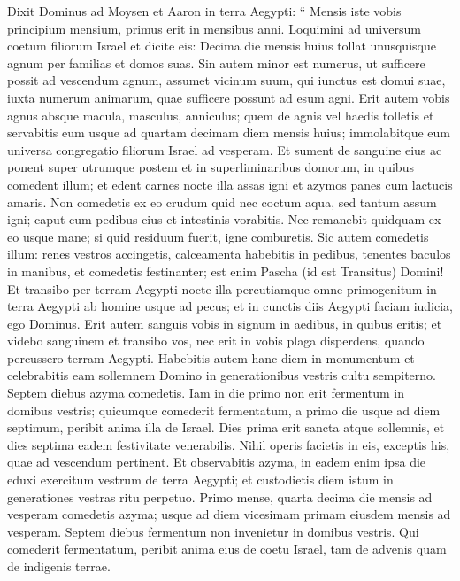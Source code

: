 \begin{biblechapter}
\begin{biblechapter}
\begin{biblechapter}
\begin{biblechapter}
\begin{biblechapter}
\begin{biblechapter}
\begin{biblechapter}
\begin{biblechapter}
\begin{biblechapter}
\begin{biblechapter}
\begin{biblechapter}
\begin{biblechapter}
\verse Dixit Dominus ad Moysen et Aaron in terra Aegypti: 
\verse “ Mensis iste vobis principium mensium, primus erit in mensibus anni. 
\verse Loquimini ad universum coetum filiorum Israel et dicite eis: Decima die mensis huius tollat unusquisque agnum per familias et domos suas. 
\verse Sin autem minor est numerus, ut sufficere possit ad vescendum agnum, assumet vicinum suum, qui iunctus est domui suae, iuxta numerum animarum, quae sufficere possunt ad esum agni. 
\verse Erit autem vobis agnus absque macula, masculus, anniculus; quem de agnis vel haedis tolletis 
\verse et servabitis eum usque ad quartam decimam diem mensis huius; immolabitque eum universa congregatio filiorum Israel ad vesperam. 
\verse Et sument de sanguine eius ac ponent super utrumque postem et in superliminaribus domorum, in quibus comedent illum; 
\verse et edent carnes nocte illa assas igni et azymos panes cum lactucis amaris. 
\verse Non comedetis ex eo crudum quid nec coctum aqua, sed tantum assum igni; caput cum pedibus eius et intestinis vorabitis. 
\verse Nec remanebit quidquam ex eo usque mane; si quid residuum fuerit, igne comburetis. 
\verse Sic autem comedetis illum: renes vestros accingetis, calceamenta habebitis in pedibus, tenentes baculos in manibus, et comedetis festinanter; est enim Pascha (id est Transitus) Domini!
 \verse Et transibo per terram Aegypti nocte illa percutiamque omne primogenitum in terra Aegypti ab homine usque ad pecus; et in cunctis diis Aegypti faciam iudicia, ego Dominus. 
\verse Erit autem sanguis vobis in signum in aedibus, in quibus eritis; et videbo sanguinem et transibo vos, nec erit in vobis plaga disperdens, quando percussero terram Aegypti. 
\verse Habebitis autem hanc diem in monumentum et celebrabitis eam sollemnem Domino in generationibus vestris cultu sempiterno.
 \verse Septem diebus azyma comedetis. Iam in die primo non erit fermentum in domibus vestris; quicumque comederit fermentatum, a primo die usque ad diem septimum, peribit anima illa de Israel.
 \verse Dies prima erit sancta atque sollemnis, et dies septima eadem festivitate venerabilis. Nihil operis facietis in eis, exceptis his, quae ad vescendum pertinent.
 \verse Et observabitis azyma, in eadem enim ipsa die eduxi exercitum vestrum de terra Aegypti; et custodietis diem istum in generationes vestras ritu perpetuo. 
\verse Primo mense, quarta decima die mensis ad vesperam comedetis azyma; usque ad diem vicesimam primam eiusdem mensis ad vesperam.
 \verse Septem diebus fermentum non invenietur in domibus vestris. Qui comederit fermentatum, peribit anima eius de coetu Israel, tam de advenis quam de indigenis terrae. 

\end{biblechapter}
\end{biblechapter}
\end{biblechapter}
\end{biblechapter}
\end{biblechapter}
\end{biblechapter}
\end{biblechapter}
\end{biblechapter}
\end{biblechapter}
\end{biblechapter}
\end{biblechapter}
\end{biblechapter}
